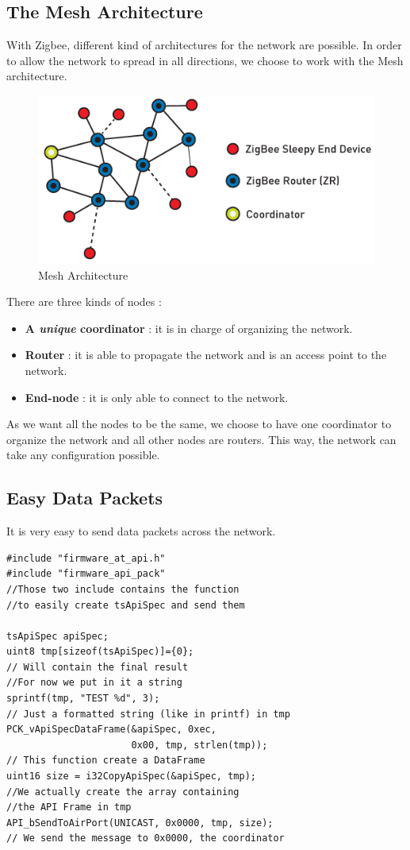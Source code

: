 \subsection{The Mesh Architecture}

With Zigbee, different kind of architectures for the network are possible. In order to allow the network to spread in all directions, we choose to work with the Mesh architecture.

\begin{figure}[ht]
\centering
\includegraphics[width=.6\linewidth]{ember-mesh-networking-supported-device}
\caption[Mesh Architecture]{\label{f:ember-mesh-networking-supported-device}Mesh Architecture}
\end{figure}

There are three kinds of nodes :
\begin{itemize}
\item \textbf{A \textit{unique} coordinator} : it is in charge of organizing the network.
\item \textbf{Router} : it is able to propagate the network and is an access point to the network.
\item \textbf{End-node} : it is only able to connect to the network.
\end{itemize}

As we want all the nodes to be the same, we choose to have one coordinator to organize the network and all other nodes are routers. This way, the network can take any configuration possible.

\subsection{Easy Data Packets}

It is very easy to send data packets across the network.

\begin{lstlisting}[frame=single]
#include "firmware_at_api.h"
#include "firmware_api_pack"
//Those two include contains the function
//to easily create tsApiSpec and send them

tsApiSpec apiSpec;
uint8 tmp[sizeof(tsApiSpec)]={0}; 
// Will contain the final result
//For now we put in it a string
sprintf(tmp, "TEST %d", 3); 
// Just a formatted string (like in printf) in tmp
PCK_vApiSpecDataFrame(&apiSpec, 0xec,
                      0x00, tmp, strlen(tmp));
// This function create a DataFrame
uint16 size = i32CopyApiSpec(&apiSpec, tmp); 
//We actually create the array containing 
//the API Frame in tmp
API_bSendToAirPort(UNICAST, 0x0000, tmp, size);
// We send the message to 0x0000, the coordinator
\end{lstlisting}

